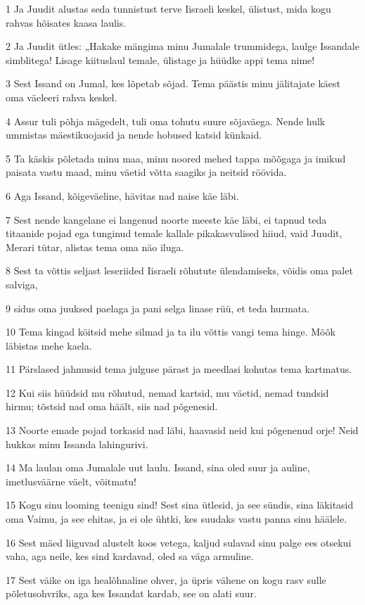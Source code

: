 \par 1 Ja Juudit alustas seda tunnistust terve Iisraeli keskel, ülistust, mida kogu rahvas hõisates kaasa laulis.
\par 2 Ja Juudit ütles: „Hakake mängima minu Jumalale trummidega, laulge Issandale simblitega! Lisage kiituslaul temale, ülistage ja hüüdke appi tema nime!
\par 3 Sest Issand on Jumal, kes lõpetab sõjad. Tema päästis minu jälitajate käest oma väeleeri rahva keskel.
\par 4 Assur tuli põhja mägedelt, tuli oma tohutu suure sõjaväega. Nende hulk ummistas mäestikuojasid ja nende hobused katsid künkaid.
\par 5 Ta käskis põletada minu maa, minu noored mehed tappa mõõgaga ja imikud paisata vastu maad, minu väetid võtta saagiks ja neitsid röövida.
\par 6 Aga Issand, kõigeväeline, hävitas nad naise käe läbi.
\par 7 Sest nende kangelane ei langenud noorte meeste käe läbi, ei tapnud teda titaanide pojad ega tunginud temale kallale pikakasvulised hiiud, vaid Juudit, Merari tütar, alistas tema oma näo iluga.
\par 8 Sest ta võttis seljast leseriided Iisraeli rõhutute ülendamiseks, võidis oma palet salviga,
\par 9 sidus oma juuksed paelaga ja pani selga linase rüü, et teda hurmata.
\par 10 Tema kingad köitsid mehe silmad ja ta ilu võttis vangi tema hinge. Mõõk läbistas mehe kaela.
\par 11 Pärslased jahmusid tema julguse pärast ja meedlasi kohutas tema kartmatus.
\par 12 Kui siis hüüdsid mu rõhutud, nemad kartsid, mu väetid, nemad tundsid hirmu; tõstsid nad oma häält, siis nad põgenesid.
\par 13 Noorte emade pojad torkasid nad läbi, haavasid neid kui põgenenud orje! Neid hukkas minu Issanda lahingurivi.
\par 14 Ma laulan oma Jumalale uut laulu. Issand, sina oled suur ja auline, imetlusväärne väelt, võitmatu!
\par 15 Kogu sinu looming teenigu sind! Sest sina ütlesid, ja see sündis, sina läkitasid oma Vaimu, ja see ehitas, ja ei ole ühtki, kes suudaks vastu panna sinu häälele.
\par 16 Sest mäed liiguvad alustelt koos vetega, kaljud sulavad sinu palge ees otsekui vaha, aga neile, kes sind kardavad, oled sa väga armuline.
\par 17 Sest väike on iga healõhnaline ohver, ja üpris vähene on kogu rasv sulle põletusohvriks, aga kes Issandat kardab, see on alati suur.
